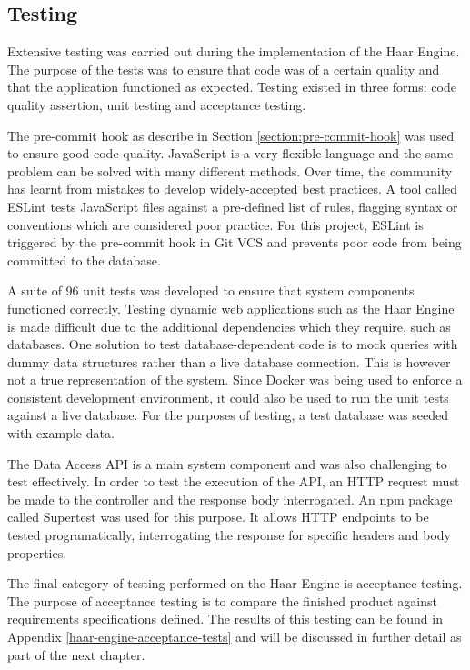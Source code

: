 
    \subsection{Testing}
      Extensive testing was carried out during the implementation of the Haar Engine. The purpose of the tests was to ensure that code was of a certain quality and that the application functioned as expected. Testing existed in three forms: code quality assertion, unit testing and acceptance testing.

      The pre-commit hook as describe in Section \ref{section:pre-commit-hook} was used to ensure good code quality. JavaScript is a very flexible language and the same problem can be solved with many different methods. Over time, the community has learnt from mistakes to develop widely-accepted best practices. A tool called ESLint tests JavaScript files against a pre-defined list of rules, flagging syntax or conventions which are considered poor practice. For this project, ESLint is triggered by the pre-commit hook in Git VCS and prevents poor code from being committed to the database.

      A suite of 96 unit tests was developed to ensure that system components functioned correctly. Testing dynamic web applications such as the Haar Engine is made difficult due to the additional dependencies which they require, such as databases. One solution to test database-dependent code is to mock queries with dummy data structures rather than a live database connection. This is however not a true representation of the system. Since Docker was being used to enforce a consistent development environment, it could also be used to run the unit tests against a live database. For the purposes of testing, a test database was seeded with example data.

      The Data Access API is a main system component and was also challenging to test effectively. In order to test the execution of the API, an HTTP request must be made to the controller and the response body interrogated. An npm package called Supertest was used for this purpose. It allows HTTP endpoints to be tested programatically, interrogating the response for specific headers and body properties.

      The final category of testing performed on the Haar Engine is acceptance testing. The purpose of acceptance testing is to compare the finished product against requirements specifications defined. The results of this testing can be found in Appendix \ref{haar-engine-acceptance-tests} and will be discussed in further detail as part of the next chapter.

